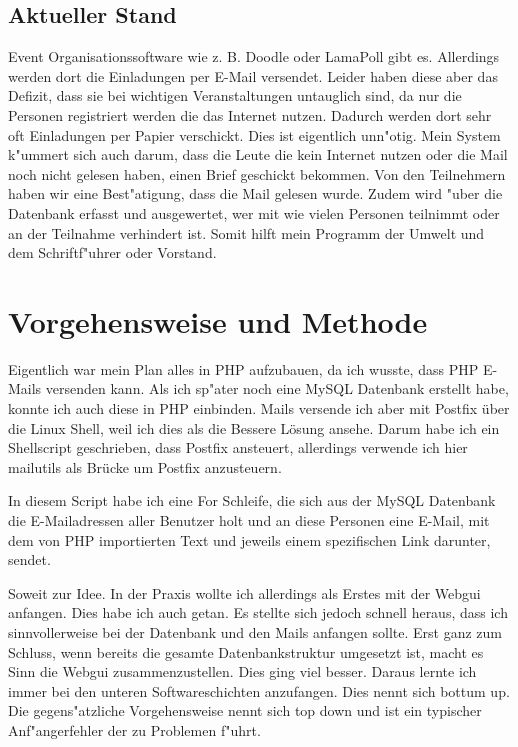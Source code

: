 \documentclass[12pt,twoside]{article}  %
\begin{document}
    \subsection{Aktueller Stand}
    Event Organisationssoftware wie z. B. Doodle \cite{Doodle} oder LamaPoll \cite{LamaPool} gibt es. Allerdings werden dort  
    die Einladungen per E-Mail versendet. Leider haben diese aber
    das Defizit, dass sie bei wichtigen Veranstaltungen untauglich sind, da nur die Personen registriert 
    werden die das Internet nutzen. Dadurch werden dort sehr oft Einladungen per
    Papier verschickt. Dies ist eigentlich unn"otig. Mein System k"ummert sich auch darum, dass die Leute die kein Internet 
    nutzen oder die Mail noch nicht gelesen haben, einen Brief geschickt bekommen. 
    Von den Teilnehmern haben wir eine Best"atigung, dass die Mail gelesen wurde. Zudem wird "uber die Datenbank erfasst und 
    ausgewertet, wer mit wie vielen Personen teilnimmt oder an der Teilnahme verhindert ist. Somit hilft mein Programm der Umwelt und dem Schriftf"uhrer oder Vorstand. 


  \section{Vorgehensweise und Methode} %
  Eigentlich war mein Plan alles in PHP 
  \cite{php} 
  aufzubauen, da ich wusste, dass PHP E-Mails versenden kann. 
  Als ich sp"ater noch eine MySQL Datenbank erstellt habe, konnte ich auch diese in PHP einbinden. Mails versende 
  ich aber mit Postfix \cite{postfix} über die Linux Shell, weil ich dies als die Bessere Lösung ansehe. Darum habe ich ein Shellscript geschrieben, dass 
  Postfix ansteuert, allerdings verwende ich hier \glqq mailutils\grqq{} als Brücke um Postfix anzusteuern. 
 
  In diesem Script habe ich eine For Schleife, die sich aus der MySQL 
  Datenbank die E-Mailadressen aller Benutzer holt und an diese Personen eine E-Mail, mit dem von PHP importierten 
  Text und jeweils einem spezifischen Link darunter, sendet.
 
  Soweit zur Idee. In der Praxis wollte ich allerdings als Erstes 
  mit der Webgui anfangen. Dies habe ich auch getan. Es stellte sich jedoch schnell heraus, dass ich 
  sinnvollerweise bei der Datenbank und den Mails anfangen sollte. Erst ganz zum Schluss, wenn bereits 
  die gesamte Datenbankstruktur umgesetzt ist, macht es Sinn die Webgui zusammenzustellen. Dies ging viel 
  besser. Daraus lernte ich immer bei den \glqq unteren\grqq{} Softwareschichten 
  \cite{softwareschichten} 
  anzufangen. Dies nennt sich 
  \glqq bottum up\grqq{}. Die gegens"atzliche Vorgehensweise nennt sich \glqq top down\grqq{} und ist ein typischer Anf"angerfehler der zu Problemen f"uhrt.
  
\end{document}

